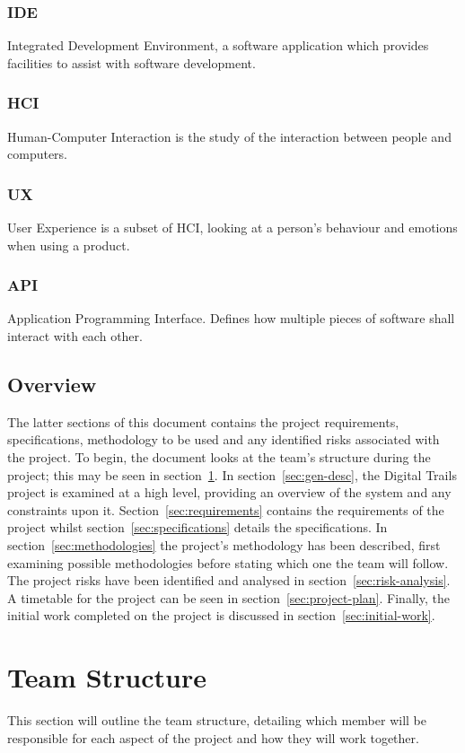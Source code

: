 \documentclass[11pt,a4paper]{article}
\begin{document}
\subsubsection{IDE}
Integrated Development Environment, a software application which provides facilities to assist with software development.

\subsubsection{HCI}
Human-Computer Interaction is the study of the interaction between people and computers.

\subsubsection{UX}
User Experience is a subset of HCI, looking at a person's behaviour and emotions when using a product.

\subsubsection{API}
Application Programming Interface. Defines how multiple pieces of software shall interact with each other.

\subsection{Overview}
The latter sections of this document contains the project requirements, specifications, methodology to be used and any identified risks associated with the project. To begin, the document looks at the team's structure during the project; this may be seen in section~\ref{sec:team-structure}. In section~\ref{sec:gen-desc}, the Digital Trails project is examined at a high level, providing an overview of the system and any constraints upon it. Section~\ref{sec:requirements} contains the requirements of the project whilst section~\ref{sec:specifications} details the specifications. In section~\ref{sec:methodologies} the project's methodology has been described, first examining possible methodologies before stating which one the team will follow. The project risks have been identified and analysed in section~\ref{sec:risk-analysis}. A timetable for the project can be seen in section~\ref{sec:project-plan}. Finally, the initial work completed on the project is discussed in section~\ref{sec:initial-work}.

\section{Team Structure}
\label{sec:team-structure}
This section will outline the team structure, detailing which member will be responsible for each aspect of the project and how they will work together. 
\end{document}
